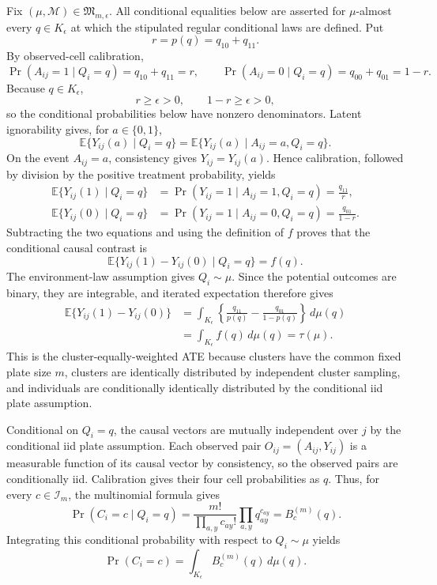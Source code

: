 Fix \((\mu,\mathcal M)\in\mathfrak M_{m,\epsilon}\). All conditional equalities below are asserted for \(\mu\)-almost every \(q\in K_{\epsilon}\) at which the stipulated regular conditional laws are defined. Put
\[
 r=p(q)=q_{10}+q_{11}.
\]
By observed-cell calibration,
\[
 \Pr(A_{ij}=1\mid Q_i=q)=q_{10}+q_{11}=r,
 \qquad
 \Pr(A_{ij}=0\mid Q_i=q)=q_{00}+q_{01}=1-r.
\]
Because \(q\in K_{\epsilon}\),
\[
 r\geq\epsilon>0,
 \qquad
 1-r\geq\epsilon>0,
\]
so the conditional probabilities below have nonzero denominators. Latent ignorability gives, for \(a\in\{0,1\}\),
\[
 \mathbb E\{Y_{ij}(a)\mid Q_i=q\}
 =\mathbb E\{Y_{ij}(a)\mid A_{ij}=a,Q_i=q\}.
\]
On the event \(A_{ij}=a\), consistency gives \(Y_{ij}=Y_{ij}(a)\). Hence calibration, followed by division by the positive treatment probability, yields
\[
 \begin{aligned}
 \mathbb E\{Y_{ij}(1)\mid Q_i=q\}
 &=\Pr(Y_{ij}=1\mid A_{ij}=1,Q_i=q)
 =\frac{q_{11}}{r},\\
 \mathbb E\{Y_{ij}(0)\mid Q_i=q\}
 &=\Pr(Y_{ij}=1\mid A_{ij}=0,Q_i=q)
 =\frac{q_{01}}{1-r}.
 \end{aligned}
\]
Subtracting the two equations and using the definition of \(f\) proves that the conditional causal contrast is
\[
 \mathbb E\{Y_{ij}(1)-Y_{ij}(0)\mid Q_i=q\}=f(q).
\]
The environment-law assumption gives \(Q_i\sim\mu\). Since the potential outcomes are binary, they are integrable, and iterated expectation therefore gives
\[
 \begin{aligned}
 \mathbb E\{Y_{ij}(1)-Y_{ij}(0)\}
 &=\int_{K_{\epsilon}}
 \left\{\frac{q_{11}}{p(q)}-\frac{q_{01}}{1-p(q)}\right\}\,d\mu(q)\\
 &=\int_{K_{\epsilon}}f(q)\,d\mu(q)
 =\tau(\mu).
 \end{aligned}
\]
This is the cluster-equally-weighted ATE because clusters have the common fixed plate size \(m\), clusters are identically distributed by independent cluster sampling, and individuals are conditionally identically distributed by the conditional iid plate assumption.

Conditional on \(Q_i=q\), the causal vectors are mutually independent over \(j\) by the conditional iid plate assumption. Each observed pair \(O_{ij}=(A_{ij},Y_{ij})\) is a measurable function of its causal vector by consistency, so the observed pairs are conditionally iid. Calibration gives their four cell probabilities as \(q\). Thus, for every \(c\in\mathcal I_m\), the multinomial formula gives
\[
 \Pr(C_i=c\mid Q_i=q)
 =\frac{m!}{\prod_{a,y}c_{ay}!}\prod_{a,y}q_{ay}^{c_{ay}}
 =B_c^{(m)}(q).
\]
Integrating this conditional probability with respect to \(Q_i\sim\mu\) yields
\[
 \Pr(C_i=c)=\int_{K_{\epsilon}}B_c^{(m)}(q)\,d\mu(q).
\]

